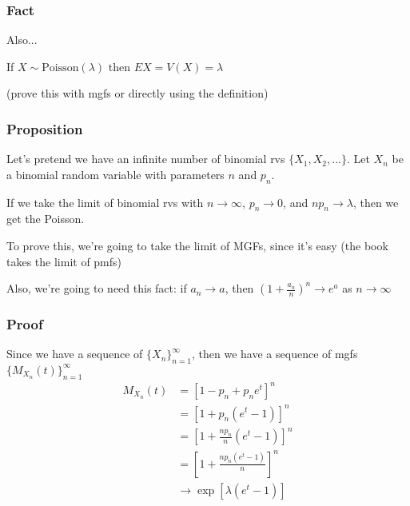 \documentclass{beamer}
\begin{document}
\begin{frame}
\frametitle{Fact}

Also...

If $X \sim \text{Poisson}(\lambda)$ then $EX = V(X) =\lambda$

(prove this with mgfs or directly using the definition)
\end{frame}


\begin{frame}
\frametitle{Proposition}

Let's pretend we have an infinite number of binomial rvs $\{X_1, X_2, \ldots\}$. Let $X_n$ be a binomial random variable with parameters $n$ and $p_n$.
\newline

If we take the limit of binomial rvs with $n \to \infty$, $p_n \to 0$, and $np_n \to \lambda$, then we get the Poisson.
\newline

To prove this, we're going to take the limit of MGFs, since it's easy (the book takes the limit of pmfs)
\newline

Also, we're going to need this fact: if $a_n \to a$, then $(1 + \frac{a_n}{n})^n \to e^a$ as $n \to \infty$


\end{frame}
\begin{frame}
\frametitle{Proof}

Since we have a sequence of $\{X_n\}_{n=1}^{\infty}$, then we have a sequence of mgfs $\{M_{X_n}(t)\}_{n=1}^{\infty}$
\begin{align*}
M_{X_n}(t) &= [1 - p_n + p_ne^t]^n  \\
&= [1 + p_n(e^t - 1)]^n \\
&= [1 + \frac{np_n}{n}(e^t - 1)]^n  \\
&= [1 + \frac{np_n(e^t - 1)}{n}]^n \\
&\to \exp \left[ \lambda(e^t-1)\right]
\end{align*}

\end{frame}
\end{document}
